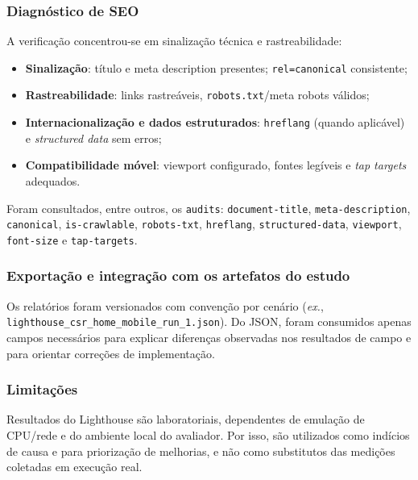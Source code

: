 \subsubsection{Diagnóstico de SEO}
A verificação concentrou-se em sinalização técnica e rastreabilidade:
\begin{itemize}
  \item \textbf{Sinalização}: título e meta description presentes; \texttt{rel=canonical} consistente;
  \item \textbf{Rastreabilidade}: links rastreáveis, \texttt{robots.txt}/meta robots válidos;
  \item \textbf{Internacionalização e dados estruturados}: \texttt{hreflang} (quando aplicável) e \textit{structured data} sem erros;
  \item \textbf{Compatibilidade móvel}: viewport configurado, fontes legíveis e \textit{tap targets} adequados.
\end{itemize}
Foram consultados, entre outros, os \texttt{audits}: \texttt{document-title}, \texttt{meta-description}, \texttt{canonical}, \texttt{is-crawlable}, \texttt{robots-txt}, \texttt{hreflang}, \texttt{structured-data}, \texttt{viewport}, \texttt{font-size} e \texttt{tap-targets}.

\subsubsection{Exportação e integração com os artefatos do estudo}
Os relatórios foram versionados com convenção por cenário (\textit{ex.}, \texttt{lighthouse\_csr\_home\_mobile\_run\_1.json}). Do JSON, foram consumidos apenas campos necessários para explicar diferenças observadas nos resultados de campo e para orientar correções de implementação.

\subsubsection{Limitações}
Resultados do Lighthouse são laboratoriais, dependentes de emulação de CPU/rede e do ambiente local do avaliador. Por isso, são utilizados como indícios de causa e para priorização de melhorias, e não como substitutos das medições coletadas em execução real.

